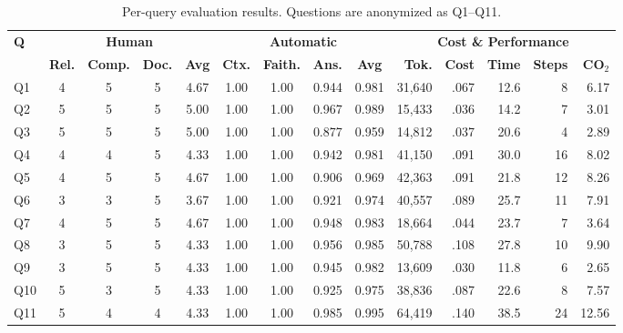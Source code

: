 \documentclass[sigconf]{acmart}
\begin{document}


\begin{table}[!t]
\centering

\caption{\small Per-query evaluation results. Questions are anonymized as Q1--Q11.}
\label{tab:evaluation_metrics}
\tiny
\setlength{\tabcolsep}{2pt}
\renewcommand{\arraystretch}{0.90}
\begin{tabular*}{\textwidth}{@{\extracolsep{\fill}}lccccccccrrrrr@{}}
\toprule
\textbf{Q}
& \multicolumn{4}{c}{\textbf{Human}}
& \multicolumn{4}{c}{\textbf{Automatic}}
& \multicolumn{5}{c}{\textbf{Cost \& Performance}} \\
\cmidrule(lr){2-5} \cmidrule(lr){6-9} \cmidrule(lr){10-14}
& \textbf{Rel.} & \textbf{Comp.} & \textbf{Doc.} & \textbf{Avg}
& \textbf{Ctx.} & \textbf{Faith.} & \textbf{Ans.} & \textbf{Avg}
& \textbf{Tok.} & \textbf{Cost} & \textbf{Time} & \textbf{Steps} & \textbf{CO$_2$} \\
\midrule
Q1  & 4 & 5 & 5 & 4.67 & 1.00 & 1.00 & 0.944 & 0.981 & 31,640 & .067 & 12.6 & 8  & 6.17 \\
Q2  & 5 & 5 & 5 & 5.00 & 1.00 & 1.00 & 0.967 & 0.989 & 15,433 & .036 & 14.2 & 7  & 3.01 \\
Q3  & 5 & 5 & 5 & 5.00 & 1.00 & 1.00 & 0.877 & 0.959 & 14,812 & .037 & 20.6 & 4  & 2.89 \\
Q4  & 4 & 4 & 5 & 4.33 & 1.00 & 1.00 & 0.942 & 0.981 & 41,150 & .091 & 30.0 & 16 & 8.02 \\
Q5  & 4 & 5 & 5 & 4.67 & 1.00 & 1.00 & 0.906 & 0.969 & 42,363 & .091 & 21.8 & 12 & 8.26 \\
Q6  & 3 & 3 & 5 & 3.67 & 1.00 & 1.00 & 0.921 & 0.974 & 40,557 & .089 & 25.7 & 11 & 7.91 \\
Q7  & 4 & 5 & 5 & 4.67 & 1.00 & 1.00 & 0.948 & 0.983 & 18,664 & .044 & 23.7 & 7  & 3.64 \\
Q8  & 3 & 5 & 5 & 4.33 & 1.00 & 1.00 & 0.956 & 0.985 & 50,788 & .108 & 27.8 & 10 & 9.90 \\
Q9  & 3 & 5 & 5 & 4.33 & 1.00 & 1.00 & 0.945 & 0.982 & 13,609 & .030 & 11.8 & 6  & 2.65 \\
Q10 & 5 & 3 & 5 & 4.33 & 1.00 & 1.00 & 0.925 & 0.975 & 38,836 & .087 & 22.6 & 8  & 7.57 \\
Q11 & 5 & 4 & 4 & 4.33 & 1.00 & 1.00 & 0.985 & 0.995 & 64,419 & .140 & 38.5 & 24 & 12.56 \\
\bottomrule
\end{tabular*}


\end{table}
\end{document}
